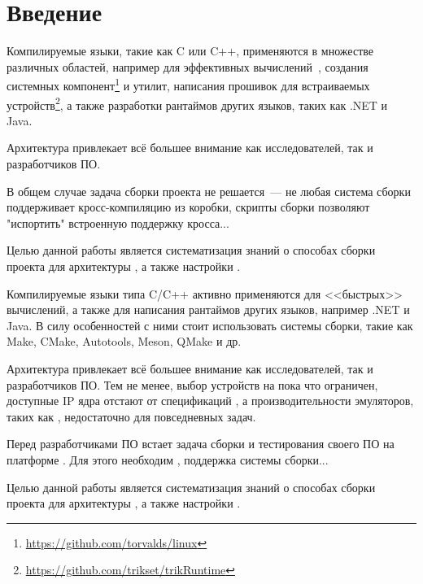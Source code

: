 
\section*{Введение}
\thispagestyle{withCompileDate}

Компилируемые языки, такие как \textsc{C} или \textsc{C++}, применяются в множестве различных областей, например для эффективных вычислений~\cite{davisAlgorithm1000SuiteSparse2019}, создания системных компонент\footnote{\url{https://github.com/torvalds/linux}} и утилит, написания прошивок для встраиваемых устройств\footnote{\url{https://github.com/trikset/trikRuntime}}, а также разработки рантаймов других языков, таких как .NET и Java.

Архитектура \riscv{} привлекает всё большее внимание как исследователей, так и разработчиков ПО. 

В общем случае задача сборки проекта не решается~--- не любая система сборки поддерживает кросс-компиляцию из коробки, скрипты сборки позволяют "испортить" встроенную поддержку кросса...

Целью данной работы является систематизация знаний о способах сборки проекта для архитектуры \riscv{}, а также настройки \ci{}.


Компилируемые языки типа C/C++ активно применяются для <<быстрых>> вычислений, а также для написания рантаймов других языков, например .NET и Java.
В силу особенностей  с ними стоит использовать системы сборки, такие как Make, CMake, Autotools, Meson, QMake и др.

Архитектура \riscv{} привлекает всё большее внимание как исследователей, так и разработчиков ПО.
Тем не менее, выбор устройств на \riscv{} пока что ограничен, доступные IP ядра отстают от спецификаций , а производительности эмуляторов, таких как \qemu{}, недостаточно для повседневных задач.

Перед разработчиками ПО встает задача сборки и тестирования своего ПО на платформе \riscv{}.
Для этого необходим \ci{}, поддержка системы сборки...

Целью данной работы является систематизация знаний о способах сборки проекта для архитектуры \riscv{}, а также настройки \ci{}.
